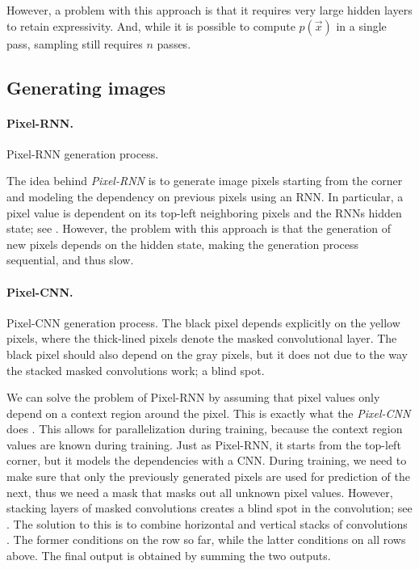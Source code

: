 However, a problem with this approach is that it requires very large hidden layers to retain
expressivity. And, while it is possible to compute $p(\vec{x})$ in a single pass, sampling still
requires $n$ passes.

\subsection{Generating images}

\paragraph{Pixel-RNN.}

\begin{marginfigure}
    \centering
    \caption{Pixel-RNN generation process.}
    \label{fig:pixel-rnn}
\end{marginfigure}

The idea behind \textit{Pixel-RNN} \citep{van2016pixel} is to generate image pixels starting from
the corner and modeling the dependency on previous pixels using an RNN. In particular, a pixel
value is dependent on its top-left neighboring pixels and the RNNs hidden state; see
. However, the problem with this approach is that the generation of new pixels
depends on the hidden state, making the generation process sequential, and thus slow.

\paragraph{Pixel-CNN.}

\begin{marginfigure}
    \centering
    \caption{Pixel-CNN generation process. The black pixel depends explicitly on the yellow pixels,
        where the thick-lined pixels denote the masked convolutional layer. The black pixel should
        also depend on the gray pixels, but it does not due to the way the stacked masked
        convolutions work; a blind spot.}
    \label{fig:pixel-cnn}
\end{marginfigure}

We can solve the problem of Pixel-RNN by assuming that pixel values only depend on a context region
around the pixel. This is exactly what the \textit{Pixel-CNN} does \citep{van2016pixel}. This
allows for parallelization during training, because the context region values are known during
training. Just as Pixel-RNN, it starts from the top-left
corner, but it models the dependencies with a CNN. During training, we need to make sure that only
the previously generated pixels are used for prediction of the next, thus we need a mask that masks
out all unknown pixel values. However, stacking layers of masked convolutions creates a blind spot
in the convolution; see . The solution to this is to combine horizontal and
vertical stacks of convolutions \citep{van2016conditional}. The former conditions on the row so
far, while the latter conditions on all rows above. The final output is obtained by summing the two
outputs.

